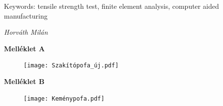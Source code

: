 \documentclass[12pt,a4paper,oneside]{report}
\begin{document}
\noindent Keywords: tensile strength test, finite element analysis, computer aided manufacturing


\vspace{3cm}\hspace{10cm}\textit{Horváth Milán}



\footnotesize  %


\newpage

\appendix
{}
\begin{center}
    \Large\textbf{Melléklet A}
\end{center}
\begin{figure}[H]
    \centering
    \texttt{[image: Szakítópofa\_új.pdf]}
\end{figure}
%
\newpage

\begin{center}
    \Large\textbf{Melléklet B}
\end{center}
\begin{figure}[H]
    \centering
    \texttt{[image: Keménypofa.pdf]}
\end{figure}
\end{document}
